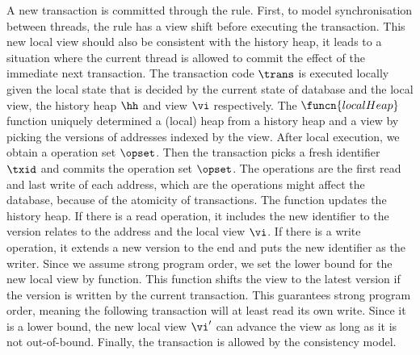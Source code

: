 


A new transaction is committed through the  rule.
First, to model synchronisation between threads, the  rule has a view shift before executing the transaction.
This new local view should also be consistent with the history heap, \ie it leads to a situation where the current thread is allowed to commit the effect of the immediate next transaction.
The transaction code \( \trans \) is executed locally given the local state that is decided by the current state of database and the local view, \ie the history heap \( \hh \) and view \( \vi \) respectively.
The \( \funcn{localHeap} \) function uniquely determined a (local) heap from a history heap and a view by picking the versions of addresses indexed by the view.
After local execution, we obtain a operation set \( \opset \).
Then the transaction picks a fresh identifier \( \txid \) and commits the operation set \( \opset \).
The operations are the first read and last write of each address, which are the operations might affect the database, because of the atomicity of transactions.
The  function updates the history heap.
If there is a read operation, it includes the new identifier to the version relates to the address and the local view \( \vi \).
If there is a write operation, it extends a new version to the end and puts the new identifier as the writer.
Since we assume strong program order, we set the lower bound for the new local view by  function.
This function shifts the view to the latest version if the version is written by the current transaction.
This guarantees strong program order, meaning the following transaction will at least read its own write.
Since it is a lower bound, the new local view \( \vi' \) can advance the view as long as it is not out-of-bound.
Finally, the transaction is allowed by the consistency model.

